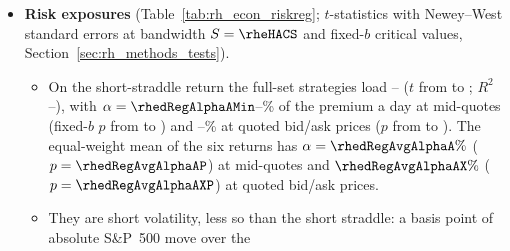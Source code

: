 \begin{itemize}
\begin{itemize}
  \item The straddle expires worthless on \rhedWorthN{} days (\rhedWorthPct\%). A normal half-hour log move with the
    implied volatility $\mathrm{IV}_t$ predicts \rhedWorthExpIV{} such days (\rhedWorthExpIVPct\%; the difference is
    \rhedWorthZ{} standard deviations), the empirical distribution of the earlier days' moves scaled by
    $\mathrm{IV}_t$ predicts \rhedWorthExpEmp, and the close is uniformly placed between adjacent strikes (mean distance
    to the nearest strike \rhedStrikeDist{} points, \rhedStrikeDistUnif{} under a uniform; Kolmogorov--Smirnov
    $D = \rhedKsD$, 5\% critical value \rhedKsCV).
  \item The full-set forecasts are short on \rhedWorthShortMin--\rhedWorthShortMax{} of these days, on which the short
    straddle keeps its whole premium; these days supply \rhePoolWorthlessShareMed\% of the positive returns of the
    median pooled forecast (Section~\ref{sec:rh_econ_results}).
  \item Monthly SPX expirations are the exception: \rhedWorthOpexN{} of the \rhedOpexN{} expire worthless against
    \rhedWorthOpexExp{} expected ($\rhedWorthOpexZ$ standard deviations), and the squared closing move averages
    \rhedOpexMoveSqIV{} of the implied variance. Outside them the share is \rhedWorthOtherPct\% against
    \rhedWorthOtherExpPct\% expected.
  \end{itemize}
\item \textbf{Risk exposures} (Table~\ref{tab:rh_econ_riskreg}; $t$-statistics with Newey--West standard errors at
  bandwidth $S = \rheHACS$ and fixed-$b$ critical values, Section~\ref{sec:rh_methods_tests}).
  \begin{itemize}
  \item On the short-straddle return the full-set strategies load \rhedRegBetaShortMin--\rhedRegBetaShortMax{}
    ($t$ from \rhedRegBetaShortTMin{} to \rhedRegBetaShortTMax; $R^2$ \rhedRegRsqAMin--\rhedRegRsqAMax), with
    $\alpha = \rhedRegAlphaAMin$--\rhedRegAlphaAMax\% of the premium a day at mid-quotes (fixed-$b$ $p$ from
    \rhedRegAlphaAPMin{} to \rhedRegAlphaAPMax) and \rhedRegAlphaAXMin--\rhedRegAlphaAXMax\% at quoted bid/ask prices
    ($p$ from \rhedRegAlphaAXPMin{} to \rhedRegAlphaAXPMax). The equal-weight mean of the six returns has $\alpha = \rhedRegAvgAlphaA\%$
    ($p = \rhedRegAvgAlphaAP$) at mid-quotes and $\rhedRegAvgAlphaAX\%$ ($p = \rhedRegAvgAlphaAXP$) at quoted
    bid/ask prices.
  \item They are short volatility, less so than the short straddle: a basis point of absolute S\&P~500 move over the

\end{itemize}
\end{itemize}
